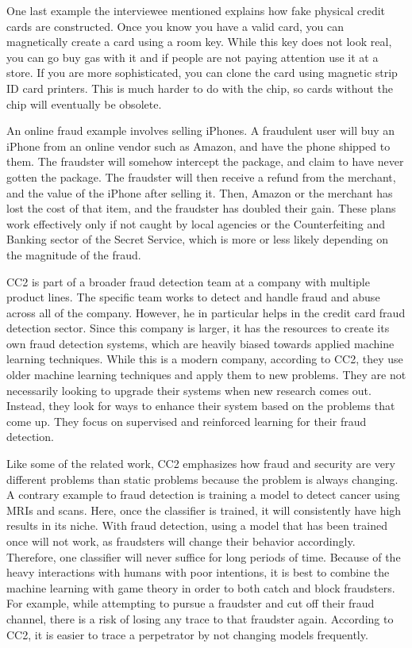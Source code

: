 \documentclass[midd]{thesis}
\begin{document}
One last example the interviewee mentioned explains how fake physical credit cards are constructed. Once you know you have a valid card, you can magnetically create a card using a room key. While this key does not look real, you can go buy gas with it and if people are not paying attention use it at a store. If you are more sophisticated, you can clone the card using magnetic strip ID card printers. This is much harder to do with the chip, so cards without the chip will eventually be obsolete. 

An online fraud example involves selling iPhones. A fraudulent user will buy an iPhone from an online vendor such as Amazon, and have the phone shipped to them. The fraudster will somehow intercept the package, and claim to have never gotten the package. The fraudster will then receive a refund from the merchant, and the value of the iPhone after selling it. Then, Amazon or the merchant has lost the cost of that item, and the fraudster has doubled their gain. These plans work effectively only if not caught by local agencies or the Counterfeiting and Banking sector of the Secret Service, which is more or less likely depending on the magnitude of the fraud. 

CC2 is part of a broader fraud detection team at a company with multiple product lines. The specific team works to detect and handle fraud and abuse across all of the company. However, he in particular helps in the credit card fraud detection sector. Since this company is larger, it has the resources to create its own fraud detection systems, which are heavily biased towards applied machine learning techniques. While this is a modern company, according to CC2, they use older machine learning techniques and apply them to new problems. They are not necessarily looking to upgrade their systems when new research comes out. Instead, they look for ways to enhance their system based on the problems that come up. They focus on supervised and reinforced learning for their fraud detection.

Like some of the related work, CC2 emphasizes how fraud and security are very different problems than static problems because the problem is always changing. A contrary example to fraud detection is training a model to detect cancer using MRIs and scans. Here, once the classifier is trained, it will consistently have high results in its niche. With fraud detection, using a model that has been trained once will not work, as fraudsters will change their behavior accordingly. Therefore, one classifier will never suffice for long periods of time. Because of the heavy interactions with humans with poor intentions, it is best to combine the machine learning with game theory in order to both catch and block fraudsters. For example, while attempting to pursue a fraudster and cut off their fraud channel, there is a risk of losing any trace to that fraudster again. According to CC2, it is easier to trace a perpetrator by not changing models frequently.
\end{document}
